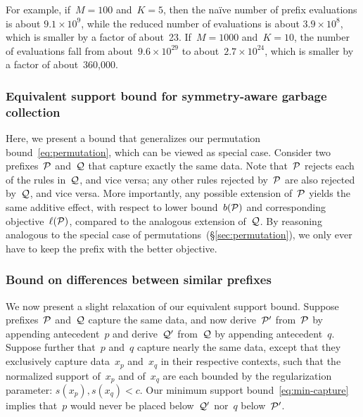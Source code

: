 For example, if~${M = 100}$ and~${K = 5}$, then the na\"ive number of prefix evaluations is
about ${9.1 \times 10^9}$, while the reduced number of evaluations is about ${3.9 \times 10^8}$,
which is smaller by a factor of about~23.
%
If~${M=1000}$ and~${K = 10}$, the number of evaluations fall from
about~${9.6 \times 10^{29}}$ to about~${2.7 \times 10^{24}}$,
which is smaller by a factor of about~360,000.
%

\subsubsection{Equivalent support bound for symmetry-aware garbage collection}

Here, we present a bound that generalizes our permutation bound~\eqref{eq:permutation},
which can be viewed as special case.
%
Consider two prefixes~$\cal P$ and~$\cal Q$ that capture exactly the same data.
%
Note that~$\cal P$ rejects each of the rules in~$\cal Q$, and vice versa;
any other rules rejected by~$\cal P$ are also rejected by~$\cal Q$, and vice versa.
%
More importantly, any possible extension of~$\cal P$ yields the same additive effect,
with respect to lower bound~$b({\mathcal P})$ and corresponding objective~$\ell({\mathcal P})$,
compared to the analogous extension of~$\cal Q$.
%
By reasoning analogous to the special case of permutations~(\S\ref{sec:permutation}),
we only ever have to keep the prefix with the better objective.

\subsubsection{Bound on differences between similar prefixes}

We now present a slight relaxation of our equivalent support bound.
%
Suppose prefixes~$\cal P$ and~$\cal Q$ capture the same data,
and now derive~$\cal P'$ from~$\cal P$ by appending antecedent~$p$
and derive~$\cal Q'$ from~$\cal Q$ by appending antecedent~$q$.
%
Suppose further that~$p$ and~$q$ capture nearly the same data, except that
they exclusively capture data~$x_p$ and~$x_q$ in their respective contexts,
such that the normalized support of~$x_p$ and of~$x_q$ are each bounded by
the regularization parameter: ${s(x_p), s(x_q) < c}$.
%
Our minimum support bound~\eqref{eq:min-capture} implies
that~$p$ would never be placed below~$\cal Q'$ nor~$q$ below~$\cal P'$.

